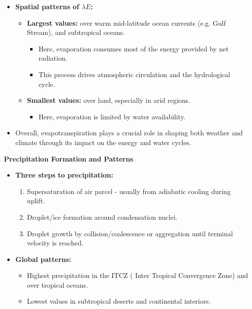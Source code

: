 \documentclass[fontsize=8pt, a4paper, landscape, fleqn]{scrartcl}
\renewcommand{\subsection}[1]{%
    \noindent\colorbox{subsectioncolor}{%
        \parbox{\dimexpr\columnwidth-2\fboxsep}{\color{white}\textbf{#1}}}%
    \vspace{0.5mm}%
}
\begin{document}
\begin{multicols*}{3}[\raggedcolumns]
\begin{itemize}
    \item \textbf{Spatial patterns of $\lambda E$:}
    \begin{itemize}
        \item \textbf{Largest values:} over warm mid-latitude ocean currents (e.g. Gulf Stream), and subtropical oceans.
        \begin{itemize}
            \item Here, evaporation consumes most of the energy provided by net radiation.
            \item This process drives atmospheric circulation and the hydrological cycle.
        \end{itemize}
        \item \textbf{Smallest values:} over land, especially in arid regions.
        \begin{itemize}
            \item Here, evaporation is limited by water availability.
        \end{itemize}
    \end{itemize}

    \item Overall, evapotranspiration plays a crucial role in shaping both weather and climate through its impact on the energy and water cycles.
\end{itemize}

\subsection{Precipitation Formation and Patterns}
\begin{itemize}
    \item \textbf{Three steps to precipitation:}
    \begin{enumerate}
        \item Supersaturation of air parcel - usually from adiabatic cooling during uplift.
        \item Droplet/ice formation around condensation nuclei.
        \item Droplet growth by collision/coalescence or aggregation until terminal velocity is reached.
    \end{enumerate}
    \item \textbf{Global patterns:}
    \begin{itemize}
        \item Highest precipitation in the ITCZ ( Inter Tropical Convergence Zone) and over tropical oceans.
        \item Lowest values in subtropical deserts and continental interiors.
    \end{itemize}
\end{itemize}


\end{multicols*}
\end{document}
